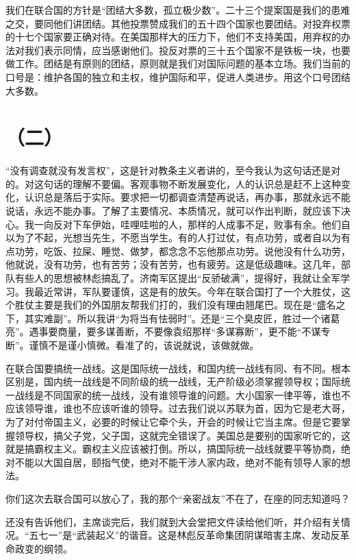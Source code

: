 我们在联合国的方针是“团结大多数，孤立极少数”。二十三个提案国是我们的患难之交，要同他们讲团结。其他投票赞成我们的五十四个国家也要团结。对投弃权票的十七个国家要正确对待。在美国那样大的压力下，他们不支持美国，用弃权的办法对我们表示同情，应当感谢他们。投反对票的三十五个国家不是铁板一块，也要做工作。团结是有原则的团结，原则就是我们对国际问题的基本立场。我们当前的口号是：维护各国的独立和主权，维护国际和平，促进人类进步。用这个口号团结大多数。

\date{一九七一年十一月八日}
\section*{（二）}

“没有调查就没有发言权”，这是针对教条主义者讲的，至今我认为这句话还是对的。对这句话的理解不要偏。客观事物不断发展变化，人的认识总是赶不上这种变化，认识总是落后于实际。要求把一切都调查清楚再说话，再办事，那就永远不能说话，永远不能办事。了解了主要情况、本质情况，就可以作出判断，就应该下决心。我一向反对下车伊始，哇哩哇啦的人，那样的人成事不足，败事有余。他们自以为了不起，光想当先生，不愿当学生。有的人打过仗，有点功劳，或者自以为有点功劳，吃饭、拉屎、睡觉、做梦，都念念不忘他那点功劳。说他没有什么功劳，他就说，没有功劳，也有苦劳；没有苦劳，也有疲劳。这是低级趣味。这几年，部队有些人的思想被林彪搞乱了。济南军区提出“反骄破满”，提得好，我就让全军学习。我最近常讲，军队要谨慎，这是有的放矢。今年在联合国打了一个大胜仗，这个胜仗主要是我们的外国朋友帮我们打的，我们没有理由翘尾巴。现在是“盛名之下，其实难副”。所以我讲“为将当有怯弱时”。还是“三个臭皮匠，胜过一个诸葛亮”。遇事要商量，要多谋善断，不要像袁绍那样“多谋寡断”，更不能“不谋专断”。谨慎不是谨小慎微。看准了的，该说就说，该做就做。

在联合国要搞统一战线。这是国际统一战线，和国内统一战线有同、有不同。根本区别是，国内统一战线是不同阶级的统一战线，无产阶级必须掌握领导权；国际统一战线是不同国家的统一战线，没有谁领导谁的问题。大小国家一律平等，谁也不应该领导谁，谁也不应该听谁的领导。过去我们说以苏联为首，因为它是老大哥，为了对付帝国主义，必要的时候让它牵个头，开会的时候让它当主席。但是它要掌握领导权，搞父子党，父子国，这就完全错误了。美国总是要别的国家听它的，这就是搞霸权主义。霸权主义应该被打倒。所以，搞国际统一战线就要平等协商，绝对不能以大国自居，颐指气使，绝对不能干涉人家内政，绝对不能有领导人家的想法。

你们这次去联合国可以放心了，我的那个“亲密战友”不在了，在座的同志知道吗？

还没有告诉他们，主席谈完后，我们就到大会堂把文件读给他们听，并介绍有关情况。“五七一”是“武装起义”的谐音。这是林彪反革命集团阴谋暗害主席、发动反革命政变的纲领。

